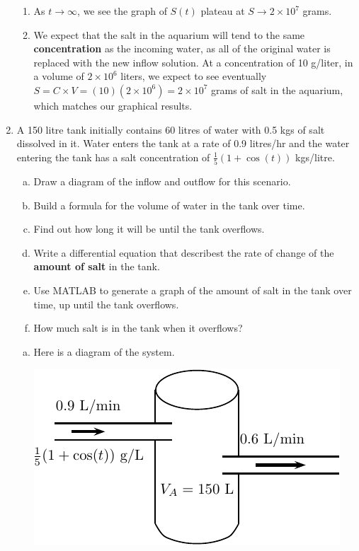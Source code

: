 \begin{enumerate}[1.]
\begin{Solution}
\begin{enumerate}
\item As $t \to \infty$, we see the graph of $S(t)$ plateau at $S \to 2 \times 10^7$ grams.

\item We expect that the salt in the aquarium will tend to the same
  {\bf concentration} as the incoming water, as all of the original
  water is replaced with the new inflow solution.  At a concentration
  of 10 g/liter, in a volume of $ 2 \times 10^6$ liters, we expect to
  see eventually $S = C\times V = (10)(2 \times 10^6) = 2 \times 10^7$
  grams of salt in the aquarium, which matches our graphical results.

\end{enumerate}
\end{Solution}



\item 
\begin{Question}
  A 150 litre tank initially contains 60 litres of water with 0.5 kgs
  of salt dissolved in it.  Water enters the tank at a rate of 0.9
  litres/hr and the water entering the tank has a salt concentration
  of $\frac{1}{5}(1 + \cos (t))$ kgs/litre. 
  \begin{enumerate}[(a)]
  \item Draw a diagram of the inflow and outflow for this scenario.
  \item Build a formula for the volume of water in the tank over time.
  \item Find out how long it will be until the tank overflows.
  \item Write a differential equation that describest the rate of
    change of the {\bf amount of salt} in the tank.
  \item Use MATLAB to generate a graph of the amount of salt in the
    tank over time, up until the tank overflows.
  \item How much salt is in the tank when it overflows?
  \end{enumerate}

\end{Question}

\begin{Solution}
  \begin{enumerate}[(a)]
  \item Here is a diagram of the system.

\includegraphics[width=0.45\linewidth]{graphics/Week09_SingleTanks/Tank1} 
 

\end{enumerate}
\end{Solution}
\end{enumerate}
